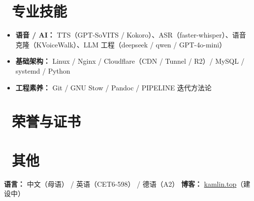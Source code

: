 \documentclass{resume}
\begin{document}
\section{\faCogs\ 专业技能}
\begin{itemize}[parsep=0.5ex]
  \item \textbf{语音 / AI：} TTS（GPT-SoVITS / Kokoro）、ASR（faster-whisper）、语音克隆（KVoiceWalk）、LLM 工程（deepseek / qwen / GPT-4o-mini）
  \item \textbf{基础架构：} Linux / Nginx / Cloudflare（CDN / Tunnel / R2）/ MySQL / systemd / Python
  \item \textbf{工程素养：} Git / GNU Stow / Pandoc / PIPELINE 迭代方法论
\end{itemize}

\section{\faHeartO\ 荣誉与证书}

\section{\faInfo\ 其他}
\textbf{语言：} 中文（母语） / 英语（CET6-598） / 德语（A2） \quad
\textbf{博客：} \href{https://kamlin.top}{kamlin.top}（建设中）
\end{document}
